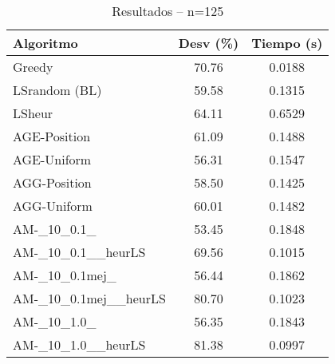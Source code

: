 \begin{table}[ht]
  \centering
  \caption{Resultados – n=125}
  \begin{tabular}{lcc}
  \hline
  Algoritmo & Desv (\%) & Tiempo (s) \\
  \hline
  Greedy & 70.76 & 0.0188 \\
  LSrandom (BL) & 59.58 & 0.1315 \\
  LSheur & 64.11 & 0.6529 \\
  AGE-Position & 61.09 & 0.1488 \\
  AGE-Uniform & 56.31 & 0.1547 \\
  AGG-Position & 58.50 & 0.1425 \\
  AGG-Uniform & 60.01 & 0.1482 \\
  AM-\_10\_0.1\_ & 53.45 & 0.1848 \\
  AM-\_10\_0.1\_\_heurLS & 69.56 & 0.1015 \\
  AM-\_10\_0.1mej\_ & 56.44 & 0.1862 \\
  AM-\_10\_0.1mej\_\_heurLS & 80.70 & 0.1023 \\
  AM-\_10\_1.0\_ & 56.35 & 0.1843 \\
  AM-\_10\_1.0\_\_heurLS & 81.38 & 0.0997 \\
  \hline
  \end{tabular}
\end{table}